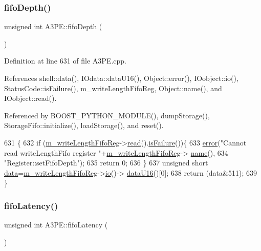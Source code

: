 \subsubsection{\texorpdfstring{fifo\+Depth()}{fifoDepth()}}
{\footnotesize\ttfamily unsigned int A3\+P\+E\+::fifo\+Depth (\begin{DoxyParamCaption}{ }\end{DoxyParamCaption})}



Definition at line 631 of file A3\+P\+E.\+cpp.



References shell\+::data(), I\+Odata\+::data\+U16(), Object\+::error(), I\+Oobject\+::io(), Status\+Code\+::is\+Failure(), m\+\_\+write\+Length\+Fifo\+Reg, Object\+::name(), and I\+Oobject\+::read().



Referenced by B\+O\+O\+S\+T\+\_\+\+P\+Y\+T\+H\+O\+N\+\_\+\+M\+O\+D\+U\+L\+E(), dump\+Storage(), Storage\+Fifo\+::initialize(), load\+Storage(), and reset().


\begin{DoxyCode}
631                             \{
632   \textcolor{keywordflow}{if} (\hyperlink{classA3PE_a9a0cb2253ea34c0be567a03684217fee}{m\_writeLengthFifoReg}->\hyperlink{classIOobject_aa07610c11963b1db6710e3c76ceea456}{read}().\hyperlink{classStatusCode_a5dd22dc6eb2c52fc4cabc58f6dea2eb7}{isFailure}())\{
633     \hyperlink{classObject_a204a95f57818c0f811933917a30eff45}{error}(\textcolor{stringliteral}{"Cannot read writeLengthFifo register "}+\hyperlink{classA3PE_a9a0cb2253ea34c0be567a03684217fee}{m\_writeLengthFifoReg}->
      \hyperlink{classObject_a300f4c05dd468c7bb8b3c968868443c1}{name}(),
634         \textcolor{stringliteral}{"Register::setFifoDepth"});
635     \textcolor{keywordflow}{return} 0;
636   \}
637   \textcolor{keywordtype}{unsigned} \textcolor{keywordtype}{short} \hyperlink{namespaceshell_a5ea2525995cedc3efd69ea8a7f034d1e}{data}=\hyperlink{classA3PE_a9a0cb2253ea34c0be567a03684217fee}{m\_writeLengthFifoReg}->\hyperlink{classIOobject_af04fb94137c3d86849f478ac5afab5d1}{io}()->
      \hyperlink{classIOdata_a8d8528b731c6cf117f8c5b9b2473390c}{dataU16}()[0];
638   \textcolor{keywordflow}{return} (data&511);   
639 \}
\end{DoxyCode}
\mbox{\label{classA3PE_a7f6959a6a38c16fa6609560827413764}} 
\subsubsection{\texorpdfstring{fifo\+Latency()}{fifoLatency()}}
{\footnotesize\ttfamily unsigned int A3\+P\+E\+::fifo\+Latency (\begin{DoxyParamCaption}{ }\end{DoxyParamCaption})}



